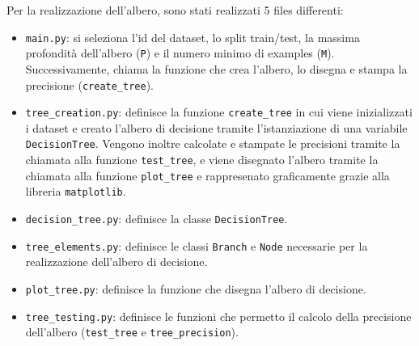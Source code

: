 \documentclass{article}
\begin{document}
Per la realizzazione dell'albero, sono stati realizzati 5 files differenti:
\begin{itemize}
	\item \texttt{main.py}: si seleziona l'id del dataset, lo split train/test, la massima profondità dell'albero (\texttt{P}) e il numero minimo di examples (\texttt{M}). Successivamente, chiama la funzione che crea l'albero, lo disegna e stampa la precisione (\texttt{create\_tree}).
	\item \texttt{tree\_creation.py}: definisce la funzione \texttt{create\_tree} in cui viene inizializzati i dataset e creato l'albero di decisione tramite l'istanziazione di una variabile \texttt{DecisionTree}. Vengono inoltre calcolate e stampate le precisioni tramite la chiamata alla funzione \texttt{test\_tree}, e viene disegnato l'albero tramite la chiamata alla funzione \texttt{plot\_tree} e rappresenato graficamente grazie alla libreria \texttt{matplotlib}.
	\item \texttt{decision\_tree.py}: definisce la classe \texttt{DecisionTree}.
	\item \texttt{tree\_elements.py}: definisce le classi \texttt{Branch} e \texttt{Node} necessarie per la realizzazione dell'albero di decisione.
	\item \texttt{plot\_tree.py}: definisce la funzione che disegna l'albero di decisione.
	\item \texttt{tree\_testing.py}: definisce le funzioni che permetto il calcolo della precisione dell'albero (\texttt{test\_tree} e \texttt{tree\_precision}).
\end{itemize}
\end{document}
